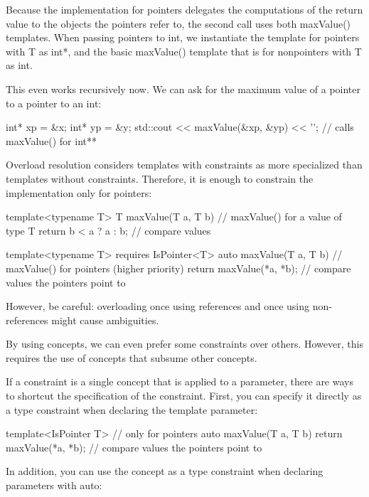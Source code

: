 Because the implementation for pointers delegates the computations of the return value to the objects the pointers refer to, the second call uses both maxValue() templates. When passing pointers to int, we instantiate the template for pointers with T as int*, and the basic maxValue() template that is for nonpointers with T as int.

This even works recursively now. We can ask for the maximum value of a pointer to a pointer to an int:

\begin{cpp}
int* xp = &x;
int* yp = &y;
std::cout << maxValue(&xp, &yp) << '\n'; // calls maxValue() for int**
\end{cpp}


Overload resolution considers templates with constraints as more specialized than templates without constraints. Therefore, it is enough to constrain the implementation only for pointers:

\begin{cpp}
template<typename T>
T maxValue(T a, T b) // maxValue() for a value of type T
{
	return b < a ? a : b; // compare values
}

template<typename T>
requires IsPointer<T>
auto maxValue(T a, T b) // maxValue() for pointers (higher priority)
{
	return maxValue(*a, *b); // compare values the pointers point to
}
\end{cpp}

However, be careful: overloading once using references and once using non-references might cause ambiguities.

By using concepts, we can even prefer some constraints over others. However, this requires the use of concepts that subsume other concepts.


If a constraint is a single concept that is applied to a parameter, there are ways to shortcut the specification of the constraint. First, you can specify it directly as a type constraint when declaring the template parameter:

\begin{cpp}
template<IsPointer T> // only for pointers
auto maxValue(T a, T b)
{
	return maxValue(*a, *b); // compare values the pointers point to
}
\end{cpp}

In addition, you can use the concept as a type constraint when declaring parameters with auto:

